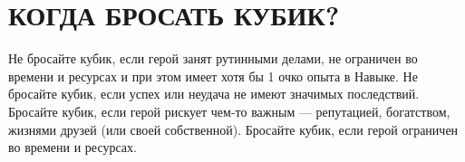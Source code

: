 \section{КОГДА БРОСАТЬ КУБИК?}
Не бросайте кубик, если герой занят рутинными делами, не ограничен во времени и ресурсах и при этом имеет хотя бы 1 очко опыта в Навыке. Не бросайте кубик, если успех или неудача не имеют значимых последствий. Бросайте кубик, если герой рискует чем-то важным — репутацией, богатством, жизнями друзей (или своей собственной). Бросайте кубик, если герой ограничен во времени и ресурсах.